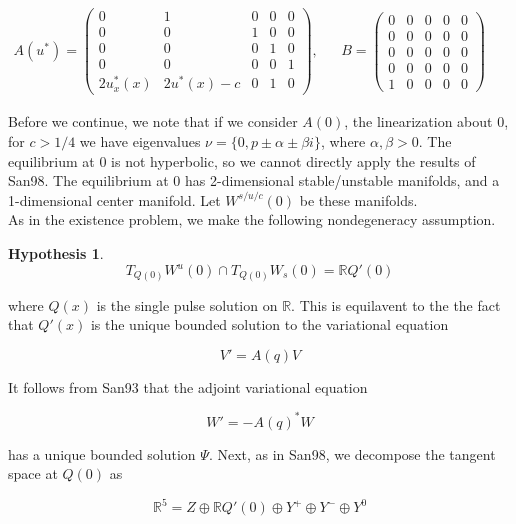 \documentclass[12pt]{article}
\def\R{{\mathbb R}}
\newtheorem{hypothesis}{Hypothesis}
\begin{document}
\begin{align}
A(u^*) = \begin{pmatrix}0 & 1 & 0 & 0 & 0 \\0 & 0 & 1 & 0 & 0 \\0 & 0 & 0 & 1 & 0 \\0 & 0 & 0 & 0 & 1 \\
2u^*_x(x) & 2u^*(x) - c & 0 & 1 & 0 \end{pmatrix}, &&
B = \begin{pmatrix}0 & 0 & 0 & 0 & 0 \\0 & 0 & 0 & 0 & 0 \\0  & 0 & 0 & 0 & 0 \\0 & 0 & 0 & 0 & 0 \\1 & 0 & 0 & 0 & 0 \end{pmatrix} && 
\end{align}

Before we continue, we note that if we consider $A(0)$, the linearization about 0, for $c > 1/4$ we have eigenvalues $\nu = \{ 0,p \pm \alpha \pm \beta i\}$, where $\alpha, \beta > 0$. The equilibrium at 0 is not hyperbolic, so we cannot directly apply the results of San98. The equilibrium at 0 has 2-dimensional stable/unstable manifolds, and a 1-dimensional center manifold. Let $W^{s/u/c}(0)$ be these manifolds.\\

As in the existence problem, we make the following nondegeneracy assumption.

\begin{hypothesis}
\[
T_{Q(0)} W^u(0) \cap T_{Q(0)} W_s(0) = \R Q'(0)
\]
\end{hypothesis}

where $Q(x)$ is the single pulse solution on $\R$. This is equilavent to the the fact that $Q'(x)$ is the unique bounded solution to the variational equation

\begin{equation}
V' = A(q)V
\end{equation}

It follows from San93 that the adjoint variational equation

\begin{equation}
W' = -A(q)^*W
\end{equation}

has a unique bounded solution $\Psi$. Next, as in San98, we decompose the tangent space at $Q(0)$ as

\begin{equation}
\R^5 = Z \oplus \R Q'(0) \oplus Y^+ \oplus Y^- \oplus Y^0
\end{equation}
\end{document}
